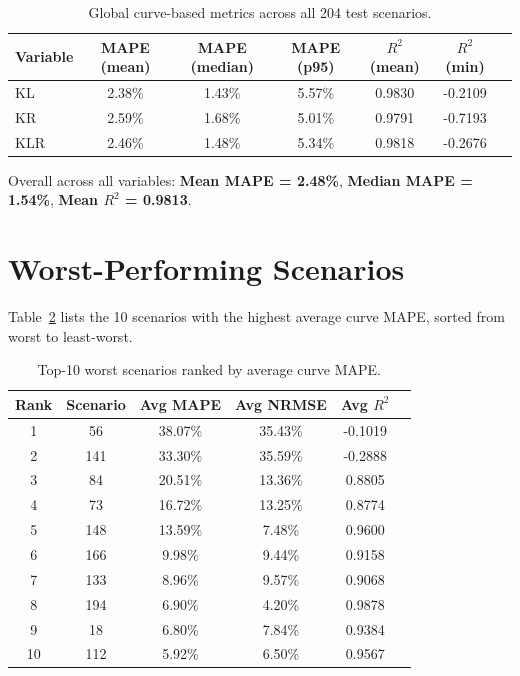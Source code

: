 \documentclass[11pt,a4paper]{article}
\begin{document}
\begin{table}[h]
\centering
\caption{Global curve-based metrics across all 204 test scenarios.}
\begin{tabular}{lcccccc}
\toprule
\textbf{Variable} & \textbf{MAPE (mean)} & \textbf{MAPE (median)} &
\textbf{MAPE (p95)} & \textbf{$R^2$ (mean)} & \textbf{$R^2$ (min)} \\
\midrule
    KL & 2.38\% & 1.43\% & 5.57\% & 0.9830 & -0.2109 \\
    KR & 2.59\% & 1.68\% & 5.01\% & 0.9791 & -0.7193 \\
    KLR & 2.46\% & 1.48\% & 5.34\% & 0.9818 & -0.2676 \\
\bottomrule
\end{tabular}
\label{tab:global_curve}
\end{table}

\noindent Overall across all variables:
\textbf{Mean MAPE = 2.48\%},
\textbf{Median MAPE = 1.54\%},
\textbf{Mean $R^2$ = 0.9813}.

\section{Worst-Performing Scenarios}

Table~\ref{tab:worst10} lists the 10 scenarios with the highest average
curve MAPE, sorted from worst to least-worst.

\begin{table}[h]
\centering
\caption{Top-10 worst scenarios ranked by average curve MAPE.}
\begin{tabular}{cccccc}
\toprule
\textbf{Rank} & \textbf{Scenario} & \textbf{Avg MAPE} &
\textbf{Avg NRMSE} & \textbf{Avg $R^2$} \\
\midrule
    1 & 56 & 38.07\% & 35.43\% & -0.1019 \\
    2 & 141 & 33.30\% & 35.59\% & -0.2888 \\
    3 & 84 & 20.51\% & 13.36\% & 0.8805 \\
    4 & 73 & 16.72\% & 13.25\% & 0.8774 \\
    5 & 148 & 13.59\% & 7.48\% & 0.9600 \\
    6 & 166 & 9.98\% & 9.44\% & 0.9158 \\
    7 & 133 & 8.96\% & 9.57\% & 0.9068 \\
    8 & 194 & 6.90\% & 4.20\% & 0.9878 \\
    9 & 18 & 6.80\% & 7.84\% & 0.9384 \\
    10 & 112 & 5.92\% & 6.50\% & 0.9567 \\
\bottomrule
\end{tabular}
\label{tab:worst10}
\end{table}
\end{document}
